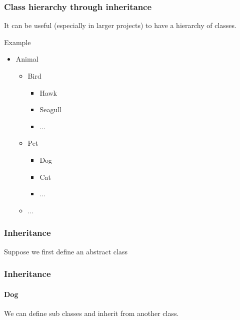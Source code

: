 \begin{frame}\frametitle{Class hierarchy through inheritance}

    It can be useful (especially in larger projects) to have a hierarchy of classes.

    Example

    \begin{itemize}
        \item Animal
            \begin{itemize}
                \item Bird
                    \begin{itemize}
                        \item Hawk
                        \item Seagull
                        \item ...
                    \end{itemize}
                \item Pet
                    \begin{itemize}
                        \item Dog
                        \item Cat
                        \item ...
                    \end{itemize}
                \item ...
            \end{itemize}
    \end{itemize}

\end{frame}

\begin{frame}\frametitle{Inheritance}

    Suppose we first define an abstract class


\end{frame}

\begin{frame}\frametitle{Inheritance}
    \framesubtitle{Dog}

    We can define sub classes and inherit from another class.


\end{frame}



